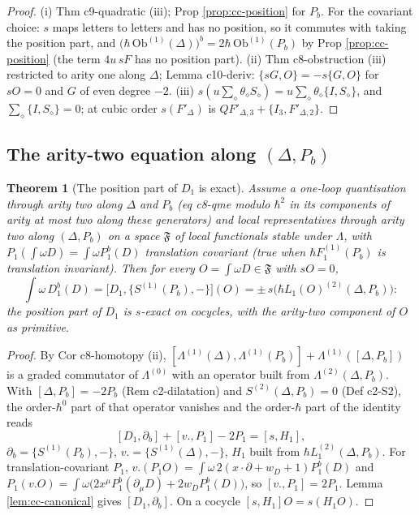 \documentclass[11pt]{article}
\numberwithin{equation}{section}
\theoremstyle{plain}
\newtheorem{theorem}{Theorem}[section]
\theoremstyle{definition}
\begin{document}
\begin{proof}
(i) Thm c9-quadratic (iii); Prop \ref{prop:cc-position} for $P_b$. For the covariant choice: $s$ maps letters to letters and has no position, so it commutes with taking the position part, and $\big(\hbar\,\mathrm{Ob}^{(1)}(\Delta)\big)^b=2\hbar\,\mathrm{Ob}^{(1)}(P_b)$ by Prop \ref{prop:cc-position} (the term $4u\,sF$ has no position part). (ii) Thm c8-obstruction (iii) restricted to arity one along $\Delta$; Lemma c10-deriv: $\{sG,O\}=-s\{G,O\}$ for $sO=0$ and $G$ of even degree $-2$. (iii) $s(u\sum_\diamond\theta_\diamond S_\diamond)=u\sum_\diamond\theta_\diamond\{I,S_\diamond\}$, and $\sum_\diamond\{I,S_\diamond\}=0$; at cubic order $s(F'_\Delta)$ is $QF'_{\Delta,3}+\{I_3,F'_{\Delta,2}\}$.
\end{proof}

\subsection{The arity-two equation along $(\Delta,P_b)$}

\begin{theorem}[The position part of $D_1$ is exact]
\label{thm:cc-arity2}
Assume a one-loop quantisation through arity two along $\Delta$ and $P_b$ (eq c8-qme modulo $\hbar^2$ in its components of arity at most two along these generators) and local representatives through arity two along $(\Delta,P_b)$ on a space $\mathfrak F$ of local functionals stable under $\Lambda$, with $P_1(\int\omega D)=\int\omega P^b_1(D)$ translation covariant (true when $\hbar F_1^{(1)}(P_b)$ is translation invariant). Then for every $O=\int\omega D\in\mathfrak F$ with $sO=0$,
\[
\int\omega\,D_1^b(D)=\big[D_1,\{S^{(1)}(P_b),-\}\big](O)=\pm\,s\big(\hbar L_1(O)^{(2)}(\Delta,P_b)\big):
\]
the position part of $D_1$ is $s$-exact on cocycles, with the arity-two component of $O$ as primitive.
\end{theorem}

\begin{proof}
By Cor c8-homotopy (ii), $[\Lambda^{(1)}(\Delta),\Lambda^{(1)}(P_b)]+\Lambda^{(1)}([\Delta,P_b])$ is a graded commutator of $\Lambda^{(0)}$ with an operator built from $\Lambda^{(2)}(\Delta,P_b)$. With $[\Delta,P_b]=-2P_b$ (Rem c2-dilatation) and $S^{(2)}(\Delta,P_b)=0$ (Def c2-S2), the order-$\hbar^0$ part of that operator vanishes and the order-$\hbar$ part of the identity reads
\[
[D_1,\partial_b]+[v.,P_1]-2P_1=[s,H_1],
\]
$\partial_b=\{S^{(1)}(P_b),-\}$, $v.=\{S^{(1)}(\Delta),-\}$, $H_1$ built from $\hbar L_1^{(2)}(\Delta,P_b)$. For translation-covariant $P_1$, $v.(P_1O)=\int\omega\,2(x\cdot\partial+w_D+1)P_1^b(D)$ and $P_1(v.O)=\int\omega\big(2x^\mu P_1^b(\partial_\mu D)+2w_DP_1^b(D)\big)$, so $[v.,P_1]=2P_1$. Lemma \ref{lem:cc-canonical} gives $[D_1,\partial_b]$. On a cocycle $[s,H_1]O=s(H_1O)$.
\end{proof}
\end{document}
